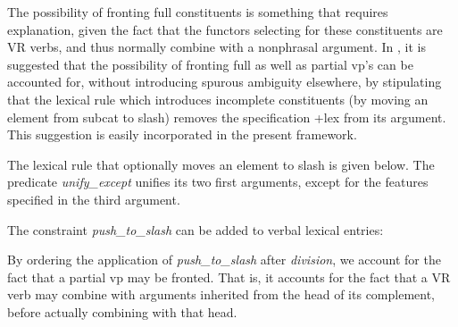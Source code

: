 The possibility of fronting full constituents is something that requires
explanation, given the fact that the functors selecting for these constituents
are VR verbs, and thus normally combine with a nonphrasal argument.  In
, it is suggested that the possibility of fronting full as
well as partial {\sc vp}'s can be accounted for, without introducing spurous
ambiguity elsewhere, by stipulating that the lexical rule which introduces
incomplete constituents (by moving an element from {\sc subcat} to {\sc slash})
removes the specification {\sc +lex} from its argument.  This suggestion is
easily incorporated in the present framework.

The lexical rule that optionally moves an element to {\sc slash} is given below.
The predicate {\em unify\_except} unifies its two first arguments, except for
the features specified in the third argument.

\pr
\pred
{}
\epred
\pred
{}
\epred
\epr

The constraint {\em push\_to\_slash} can be  added to verbal lexical entries:


\pr
\pred
{}
\epred
\pred
{}
\epred
\epr

\noindent By ordering the application of {\em push\_to\_slash} after {\em
division}, we account for the fact that a partial {\sc vp} may be fronted.  That
is, it accounts for the fact that a VR verb may combine with arguments inherited
from the head of its complement, before actually combining with that head.

